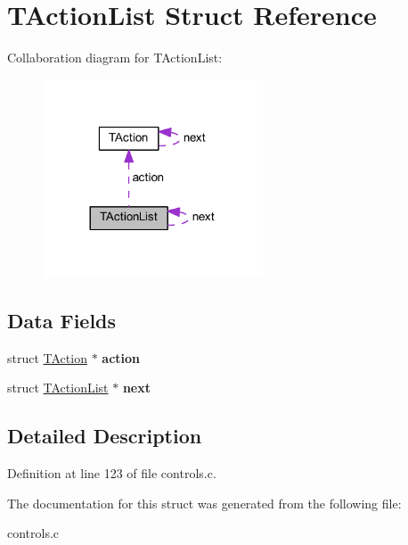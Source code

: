 \hypertarget{struct_t_action_list}{}\section{T\+Action\+List Struct Reference}
\label{struct_t_action_list}


Collaboration diagram for T\+Action\+List\+:
\nopagebreak
\begin{figure}[H]
\begin{center}
\leavevmode
\includegraphics[width=185pt]{df/d28/struct_t_action_list__coll__graph}
\end{center}
\end{figure}
\subsection*{Data Fields}
\begin{DoxyCompactItemize}
\item 
\mbox{\label{struct_t_action_list_acc88d178affd84d22b6a26a5bdd680a3}} 
struct \hyperlink{struct_t_action}{T\+Action} $\ast$ {\bfseries action}
\item 
\mbox{\label{struct_t_action_list_ac508755add7c44a4d3ddca58542fb986}} 
struct \hyperlink{struct_t_action_list}{T\+Action\+List} $\ast$ {\bfseries next}
\end{DoxyCompactItemize}


\subsection{Detailed Description}


Definition at line 123 of file controls.\+c.



The documentation for this struct was generated from the following file\+:\begin{DoxyCompactItemize}
\item 
controls.\+c\end{DoxyCompactItemize}
